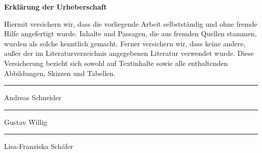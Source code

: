 \textsf{\textbf{\Large Erklärung der Urheberschaft}}

Hiermit versichern wir, dass die vorliegende Arbeit selbstständig und ohne fremde Hilfe angefertigt wurde. 
Inhalte und Passagen, die aus fremden Quellen stammen, wurden als solche kenntlich gemacht.
Ferner versichern wir, dass keine andere, außer der im Literaturverzeichnis angegebenen Literatur verwendet wurde.
Diese Versicherung bezieht sich sowohl auf Textinhalte sowie alle enthaltenden Abbildungen, Skizzen und Tabellen. 


\vspace{3em}
\rule{5cm}{0.4pt} \newline
Andreas Schneider

\vspace{1.5em}
\rule{5cm}{0.4pt} \newline
Gustav Willig

\vspace{1.5em}
\rule{5cm}{0.4pt} \newline
Lisa-Franziska Schäfer

\thispagestyle{empty}


%

%
%
